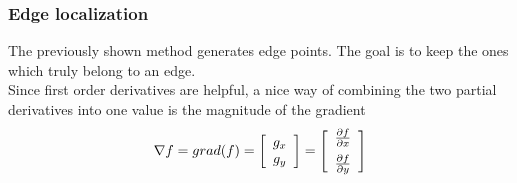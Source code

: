 \subsubsection{Edge localization}
The previously shown method generates edge points. The goal is to keep the ones which truly belong to an edge.\\
Since first order derivatives are helpful, a nice way of combining the two partial derivatives into one value is the magnitude of the gradient
\begin{equation}
	\nabla f = grad(f) = \left[\begin{array}{c} g_x \\ g_y \end{array}\right] =  \left[\displaystyle{\begin{array}{c} \frac{\partial f}{\partial x} \vspace{0.2cm}  \\ \frac{\partial f}{\partial y} \end{array}}\right] \notag
\end{equation}


